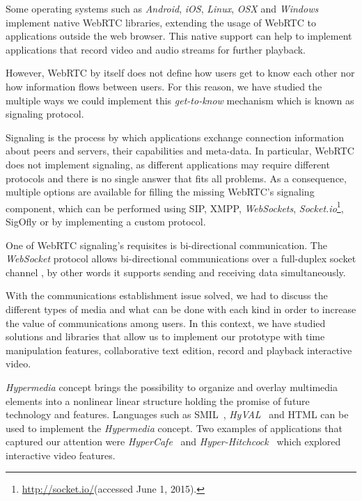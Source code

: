 \documentclass[conference,compsoc,a4paper]{IEEEtran}
\begin{document}
Some operating systems such as \emph{Android}, \emph{iOS}, \emph{Linux}, \emph{OSX} and \emph{Windows} implement native \gls{WebRTC} libraries, extending the usage of \gls{WebRTC} to applications outside the web browser. This native support can help to implement applications that record video and audio streams for further playback.

However, \gls{WebRTC} by itself does not define how users get to know each other nor how information flows between users. For this reason, we have studied the multiple ways we could implement this \emph{get-to-know} mechanism which is known as signaling protocol.


  Signaling is the process by which applications exchange connection information about peers and servers, their capabilities and meta-data.
  In particular, \gls{WebRTC} does not implement signaling, as different applications may require different protocols and there is no single answer that fits all problems.
  As a consequence, multiple options are available for filling the missing \gls{WebRTC}'s signaling component, which can be performed using \gls{SIP}\cite{rfc3261}, \gls{XMPP}, \emph{WebSockets}, \emph{Socket.io}\footnote{\url{http://socket.io/}(accessed June 1, 2015).}, \gls{SigOfly}\cite{sigofly} or by implementing a custom protocol.

  One of \gls{WebRTC} signaling's requisites is bi-directional communication. The \emph{WebSocket} protocol allows bi-directional communications over a full-duplex socket channel \cite{rfc6455}, by other words it supports sending and receiving data simultaneously.

With the communications establishment issue solved, we had to discuss the different types of media and what can be done with each kind in order to increase the value of communications among users. In this context, we have studied solutions and libraries that allow us to implement our prototype with time manipulation features, collaborative text edition, record and playback interactive video. 

	\emph{Hypermedia} concept brings the possibility to organize and overlay multimedia elements into a nonlinear linear structure holding the promise of future technology and features. Languages such as \gls{SMIL}~\cite{hyval}, \emph{HyVAL}~\cite{hyval} and \gls{HTML} can be used to implement the \emph{Hypermedia} concept. Two examples of applications that captured our attention were \emph{HyperCafe}~\cite{hypercafe} and \emph{Hyper-Hitchcock}~\cite{hitchcock} which explored interactive video features.
\end{document}
